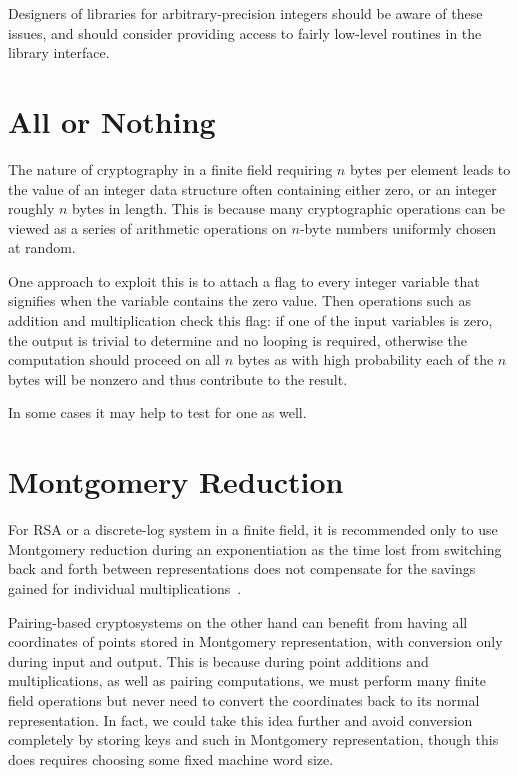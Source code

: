 Designers of libraries for arbitrary-precision integers should be aware of
these issues, and should consider providing access to fairly low-level
routines in the library interface.

\section{All or Nothing}

The nature of cryptography in a finite field requiring $n$ bytes per element
leads to the value of an integer data structure
often containing either zero, or an integer roughly $n$ bytes in length.
This is because many cryptographic operations can be viewed as a series of
arithmetic operations on $n$-byte numbers uniformly chosen at random.

One approach to exploit this is to attach a flag to every integer variable
that signifies when the variable contains the zero value. Then operations
such as addition and multiplication check this flag: if one of the input
variables is zero, the output is trivial to determine and no looping
is required, otherwise the computation should proceed on all $n$ bytes as
with high probability each of the $n$ bytes will be nonzero and thus
contribute to the result.

In some cases it may help to test for one as well.


\section{Montgomery Reduction}

For RSA or a discrete-log system in a finite field, it is recommended
only to use Montgomery reduction during an exponentiation
as the time lost from switching back and forth between representations
does not compensate for the savings gained for individual multiplications~\cite{handbook}.

Pairing-based cryptosystems on the other hand can benefit from having
all coordinates of points stored in Montgomery representation, with conversion
only during input and output.
This is because during point additions and multiplications,
as well as pairing computations,
we must perform many finite field operations but never need to convert the
coordinates back to its normal representation.
In fact, we could take this idea further and
avoid conversion completely by storing keys and such in
Montgomery representation, though this does requires choosing
some fixed machine word size.

